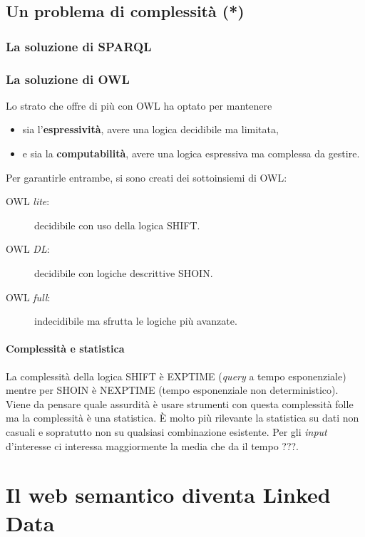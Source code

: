		\subsection{Un problema di complessità (*)}
			
			\subsubsection{La soluzione di SPARQL}
			
			\subsubsection{La soluzione di OWL}
				Lo strato che offre di più con OWL ha optato per mantenere
				\begin{itemize}[label={}]
					\item sia l'\textbf{espressività}, avere una logica decidibile ma limitata,
					\item e sia la \textbf{computabilità}, avere una logica espressiva ma complessa da gestire.
				\end{itemize}
				Per garantirle entrambe, si sono creati dei sottoinsiemi di OWL:
				\begin{description}
					\item[OWL \emph{lite}:] decidibile con uso della logica SHIFT.
					\item[OWL \emph{DL}:] decidibile con logiche descrittive SHOIN.
					\item[OWL \emph{full}:] indecidibile ma sfrutta le logiche più avanzate.
				\end{description}
				
				\paragraph{Complessità e statistica}	
					La complessità della logica SHIFT è EXPTIME (\emph{query} a tempo esponenziale) mentre per SHOIN è NEXPTIME (tempo esponenziale non deterministico). Viene da pensare quale assurdità è usare strumenti con questa complessità folle ma la complessità è una statistica. È molto più rilevante la statistica su dati non casuali e sopratutto non su qualsiasi combinazione esistente. Per gli \emph{input} d'interesse ci interessa maggiormente la media che da il tempo ???.
				
		
	\section{Il web semantico diventa Linked Data}
		
